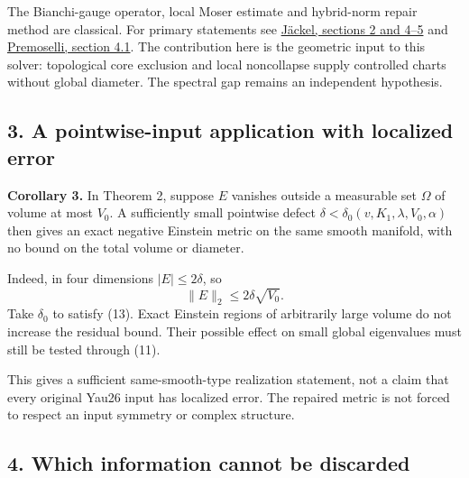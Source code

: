 \documentclass[
  11pt,
]{article}
\begin{document}
The Bianchi-gauge operator, local Moser estimate and hybrid-norm repair
method are classical. For primary statements see
\href{https://arxiv.org/html/2502.16692v2}{Jäckel, sections 2 and 4--5}
and \href{https://numdam.org/item/10.5802/tsg.367.pdf}{Premoselli,
section 4.1}. The contribution here is the geometric input to this
solver: topological core exclusion and local noncollapse supply
controlled charts without global diameter. The spectral gap remains an
independent hypothesis.

\hypertarget{a-pointwise-input-application-with-localized-error}{%
\subsection{3. A pointwise-input application with localized
error}\label{a-pointwise-input-application-with-localized-error}}

\textbf{Corollary 3.} In Theorem 2, suppose \(E\) vanishes outside a
measurable set \(\Omega\) of volume at most \(V_0\). A sufficiently
small pointwise defect \(\delta<\delta_0(v,K_1,\lambda,V_0,\alpha)\)
then gives an exact negative Einstein metric on the same smooth
manifold, with no bound on the total volume or diameter.

Indeed, in four dimensions \(|E|\le2\delta\), so \[
 \|E\|_2\le2\delta\sqrt{V_0}.                               \tag{21}
\] Take \(\delta_0\) to satisfy (13). Exact Einstein regions of
arbitrarily large volume do not increase the residual bound. Their
possible effect on small global eigenvalues must still be tested through
(11).

This gives a sufficient same-smooth-type realization statement, not a
claim that every original Yau26 input has localized error. The repaired
metric is not forced to respect an input symmetry or complex structure.

\hypertarget{which-information-cannot-be-discarded}{%
\subsection{4. Which information cannot be
discarded}\label{which-information-cannot-be-discarded}}
\end{document}
